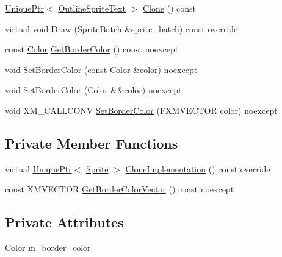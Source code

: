\begin{DoxyCompactItemize}
\item 
\hyperlink{namespacemage_a3316d7143a973e37adf1110f2e80ca31}{Unique\+Ptr}$<$ \hyperlink{classmage_1_1_outline_sprite_text}{Outline\+Sprite\+Text} $>$ \hyperlink{classmage_1_1_outline_sprite_text_aa188cb104f6f00fdc75c532d66869f02}{Clone} () const
\item 
virtual void \hyperlink{classmage_1_1_outline_sprite_text_a524e9ad1caeeeaa32405e61d1a5e1032}{Draw} (\hyperlink{classmage_1_1_sprite_batch}{Sprite\+Batch} \&sprite\+\_\+batch) const override
\item 
const \hyperlink{structmage_1_1_color}{Color} \hyperlink{classmage_1_1_outline_sprite_text_adb4936119bcc0b148c9e11f021e83940}{Get\+Border\+Color} () const noexcept
\item 
void \hyperlink{classmage_1_1_outline_sprite_text_a66b448443de5a459bb28f66c682a12bd}{Set\+Border\+Color} (const \hyperlink{structmage_1_1_color}{Color} \&color) noexcept
\item 
void \hyperlink{classmage_1_1_outline_sprite_text_a7bd6e4fc0afefb65ca9d543f52941400}{Set\+Border\+Color} (\hyperlink{structmage_1_1_color}{Color} \&\&color) noexcept
\item 
void X\+M\+\_\+\+C\+A\+L\+L\+C\+O\+NV \hyperlink{classmage_1_1_outline_sprite_text_a861b01bf303caf0c08a599f3d4a77894}{Set\+Border\+Color} (F\+X\+M\+V\+E\+C\+T\+OR color) noexcept
\end{DoxyCompactItemize}
\subsection*{Private Member Functions}
\begin{DoxyCompactItemize}
\item 
virtual \hyperlink{namespacemage_a3316d7143a973e37adf1110f2e80ca31}{Unique\+Ptr}$<$ \hyperlink{classmage_1_1_sprite}{Sprite} $>$ \hyperlink{classmage_1_1_outline_sprite_text_ac1fcc7e91b972b250e09fbb8d62f908d}{Clone\+Implementation} () const override
\item 
const X\+M\+V\+E\+C\+T\+OR \hyperlink{classmage_1_1_outline_sprite_text_a287bef30662bbd00ca999b3577249226}{Get\+Border\+Color\+Vector} () const noexcept
\end{DoxyCompactItemize}
\subsection*{Private Attributes}
\begin{DoxyCompactItemize}
\item 
\hyperlink{structmage_1_1_color}{Color} \hyperlink{classmage_1_1_outline_sprite_text_a19301d370498a08759445f415da78822}{m\+\_\+border\+\_\+color}
\end{DoxyCompactItemize}
